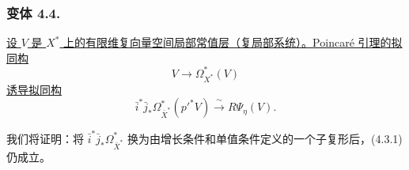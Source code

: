 \subsubsection*{变体 4.4.}
\underline{设 $V$ 是 $X^*$ 上的有限维复向量空间局部常值层（复局部系统）。Poincaré 引理的拟同构}
\[
V\longrightarrow\Omega_{X^*}^*(V)
\]
\underline{诱导拟同构}
\begin{equation}\tag{4.4.1}
\bar i^*\bar j_*\Omega_{\bar X^*}^*(p'^*V)
\xrightarrow{\ \sim\ }R\Psi_\eta(V).
\end{equation}

我们将证明：将 $\bar i^*\bar j_*\Omega_{\bar X^*}^*$ 换为由增长条件和单值条件定义的一个子复形后，(4.3.1) 仍成立。